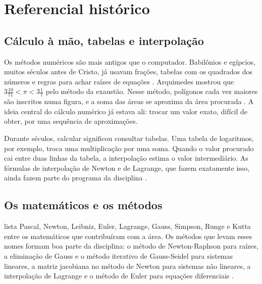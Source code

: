 \section{Referencial histórico}
\label{sec:historia}

\subsection{Cálculo à mão, tabelas e interpolação}

Os métodos numéricos são mais antigos que o computador. Babilônios e egípcios, muitos séculos antes de Cristo, já usavam frações, tabelas com os quadrados dos números e regras para achar raízes de equações \cite[p.~50]{aquino2020}. Arquimedes mostrou que \(3\tfrac{10}{71}<\pi<3\tfrac{1}{7}\) pelo método da exaustão. Nesse método, polígonos cada vez maiores são inscritos numa figura, e a soma das áreas se aproxima da área procurada \cite[p.~50]{aquino2020}. A ideia central do cálculo numérico já estava ali: trocar um valor exato, difícil de obter, por uma sequência de aproximações.

Durante séculos, calcular significou consultar tabelas. Uma tabela de logaritmos, por exemplo, troca uma multiplicação por uma soma. Quando o valor procurado cai entre duas linhas da tabela, a interpolação estima o valor intermediário. As fórmulas de interpolação de Newton e de Lagrange, que fazem exatamente isso, ainda fazem parte do programa da disciplina \cite[cap.~7]{aquino2020}.

\subsection{Os matemáticos e os métodos}

\textcite[p.~50]{aquino2020} lista Pascal, Newton, Leibniz, Euler, Lagrange, Gauss, Simpson, Runge e Kutta entre os matemáticos que contribuíram com a área. Os métodos que levam esses nomes formam boa parte da disciplina: o método de Newton-Raphson para raízes, a eliminação de Gauss e o método iterativo de Gauss-Seidel para sistemas lineares, a matriz jacobiana no método de Newton para sistemas não lineares, a interpolação de Lagrange e o método de Euler para equações diferenciais \cite[cap.~4, 5, 7 e 10]{aquino2020}.

